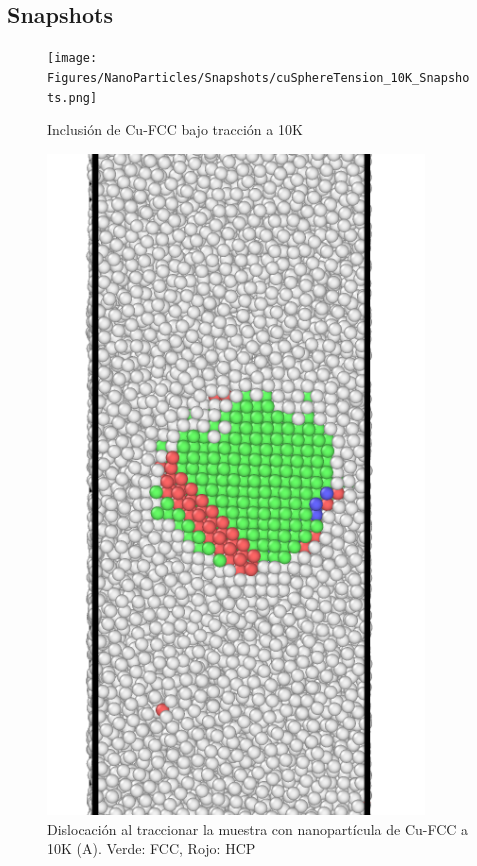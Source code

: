\documentclass[10pt, oneside]{article} %
\begin{document}
\subsection{Snapshots}

\begin{figure}[H]
\centering
\texttt{[image: Figures/NanoParticles/Snapshots/cuSphereTension\_10K\_Snapshots.png]}
\caption{Inclusión de Cu-FCC bajo tracción a 10K}
\end{figure}

\begin{figure}[H]
\centering
\includegraphics[width=10cm]{Figures/NanoParticles/cuSphereTension_10K_Snapshot_670_Macla_A.png}
\caption{Dislocación al traccionar la muestra con nanopartícula de Cu-FCC a 10K (A). Verde: FCC, Rojo: HCP}
\end{figure}
\end{document}
